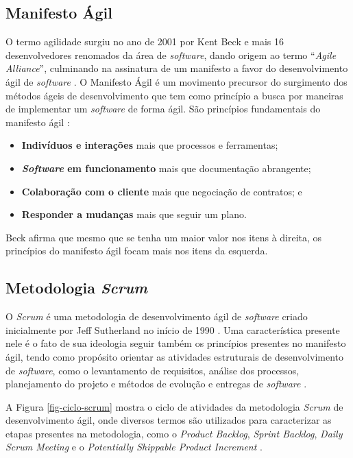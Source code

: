 \subsection{Manifesto Ágil}

\noindent O termo agilidade surgiu no ano de 2001 por Kent Beck e mais 16 desenvolvedores renomados da área de \textit{software}, dando origem ao termo ``\textit{Agile Alliance}'', culminando na assinatura de um manifesto a favor do desenvolvimento ágil de \textit{software} \cite{pressmanengenharia}. O Manifesto Ágil é um movimento precursor do surgimento dos métodos ágeis de desenvolvimento que tem como princípio a busca por maneiras de implementar um \textit{software} de forma ágil. São princípios fundamentais do manifesto ágil \cite{agilemanifesto}:

\begin{itemize}
    \item \textbf{Indivíduos e interações} mais que processos e ferramentas;
    \item \textbf{\textit{Software} em funcionamento} mais que documentação abrangente;
    \item \textbf{Colaboração com o cliente} mais que negociação de contratos; e
    \item\textbf{Responder a mudanças} mais que seguir um plano.
\end{itemize}

Beck \cite{agilemanifesto} afirma que mesmo que se tenha um maior valor nos itens à direita, os princípios do manifesto ágil focam mais nos itens da esquerda.

\subsection{Metodologia \textit{Scrum}}

\noindent O \textit{Scrum} é uma metodologia de desenvolvimento ágil de \textit{software} criado inicialmente por Jeff Sutherland no início de 1990 \cite{pressmanengenharia}. Uma característica presente nele é o fato de sua ideologia seguir também os princípios presentes no manifesto ágil, tendo como propósito orientar as atividades estruturais de desenvolvimento de \textit{software}, como o levantamento de requisitos, análise dos processos, planejamento do projeto e métodos de evolução e entregas de \textit{software} \cite{pressmanengenharia}.

A Figura \ref{fig-ciclo-scrum} mostra o ciclo de atividades da metodologia \textit{Scrum} de desenvolvimento ágil, onde diversos termos são utilizados para caracterizar as etapas presentes na metodologia, como o \textit{Product Backlog}, \textit{Sprint Backlog}, \textit{Daily Scrum Meeting} e o \textit{Potentially Shippable Product Increment} \cite{pressmanengenharia}.

